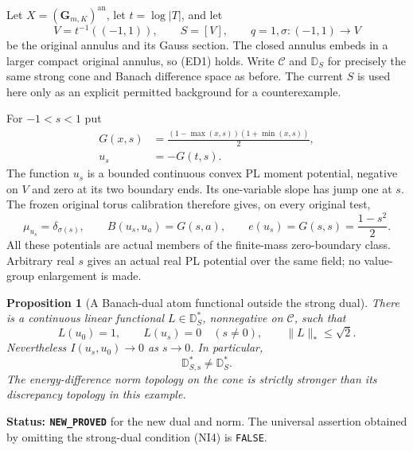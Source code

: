 \documentclass[11pt,a4paper]{article}
\numberwithin{equation}{section}
\newtheorem{proposition}[theorem]{Proposition}
\theoremstyle{definition}
\theoremstyle{remark}
\begin{document}
Let $X=(\mathbf G_{m,K})^{\mathrm{an}}$, let $t=\log|T|$, and let
\[
       V=t^{-1}((-1,1)),\qquad S=[V],\qquad q=1,
       \sigma:(-1,1)\longrightarrow V
 \tag{CG1}
\]
be the original annulus and its Gauss section. The closed annulus
embeds in a larger compact original annulus, so (ED1) holds. Write
$\mathscr C$ and $\mathbb D_S$ for precisely the same strong cone
and Banach difference space as before. The current $S$ is used here
only as an explicit permitted background for a counterexample.

For $-1<s<1$ put
\[
 \begin{split}
 G(x,s)&=\frac{(1-\max(x,s))(1+\min(x,s))}{2},\\
 u_s&=-G(t,s).
 \end{split}
 \tag{CG2}
\]
The function $u_s$ is a bounded continuous convex PL moment
potential, negative on $V$ and zero at its two boundary ends.
Its one-variable slope has jump one at $s$. The frozen original
torus calibration therefore gives, on every original test,
\[
        \mu_{u_s}=\delta_{\sigma(s)},\qquad
        B(u_s,u_a)=G(s,a),\qquad
        e(u_s)=G(s,s)=\frac{1-s^2}{2}.
 \tag{CG3}
\]
All these potentials are actual members of the finite-mass
zero-boundary class. Arbitrary real $s$ gives an actual real PL
potential over the same field; no value-group enlargement is made.

\begin{proposition}[A Banach-dual atom functional outside the strong dual]
\label{prop:r12-atom-functional-not-strong}
There is a continuous linear functional $L\in\mathbb D_S^*$,
nonnegative on $\mathscr C$, such that
\[
             L(u_0)=1,\qquad L(u_s)=0\quad(s\ne0),
             \qquad \|L\|_*\leq\sqrt2.
 \tag{CG4}
\]
Nevertheless $I(u_s,u_0)\to0$ as $s\to0$. In particular,
\[
                     \mathbb D_{S,\mathrm s}^*
                                      \ne\mathbb D_S^*.
 \tag{CG5}
\]
The energy-difference norm topology on the cone is strictly
stronger than its discrepancy topology in this example.
\end{proposition}

\noindent\textbf{Status: \texttt{NEW\_PROVED}} for the
new dual and norm. The universal assertion obtained by omitting
the strong-dual condition (NI4) is \texttt{FALSE}.
\end{document}
